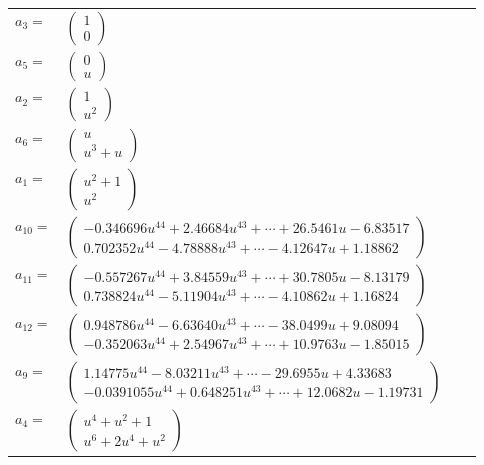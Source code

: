 \documentclass[1p]{elsarticle_modified}
\theoremstyle{definition}
\begin{document}
\begin{tabular}{m{7pt} m{180pt} m{7pt} m{180pt} }
\flushright $a_{3}=$&$\begin{pmatrix}1\\0\end{pmatrix}$ \\
\flushright $a_{5}=$&$\begin{pmatrix}0\\u\end{pmatrix}$ \\
\flushright $a_{2}=$&$\begin{pmatrix}1\\u^2\end{pmatrix}$ \\
\flushright $a_{6}=$&$\begin{pmatrix}u\\u^3+u\end{pmatrix}$ \\
\flushright $a_{1}=$&$\begin{pmatrix}u^2+1\\u^2\end{pmatrix}$ \\
\flushright $a_{10}=$&$\begin{pmatrix}-0.346696 u^{44}+2.46684 u^{43}+\cdots+26.5461 u-6.83517\\0.702352 u^{44}-4.78888 u^{43}+\cdots-4.12647 u+1.18862\end{pmatrix}$ \\
\flushright $a_{11}=$&$\begin{pmatrix}-0.557267 u^{44}+3.84559 u^{43}+\cdots+30.7805 u-8.13179\\0.738824 u^{44}-5.11904 u^{43}+\cdots-4.10862 u+1.16824\end{pmatrix}$ \\
\flushright $a_{12}=$&$\begin{pmatrix}0.948786 u^{44}-6.63640 u^{43}+\cdots-38.0499 u+9.08094\\-0.352063 u^{44}+2.54967 u^{43}+\cdots+10.9763 u-1.85015\end{pmatrix}$ \\
\flushright $a_{9}=$&$\begin{pmatrix}1.14775 u^{44}-8.03211 u^{43}+\cdots-29.6955 u+4.33683\\-0.0391055 u^{44}+0.648251 u^{43}+\cdots+12.0682 u-1.19731\end{pmatrix}$ \\
\flushright $a_{4}=$&$\begin{pmatrix}u^4+u^2+1\\u^6+2 u^4+u^2\end{pmatrix}$ \\

\end{tabular}
\end{document}
